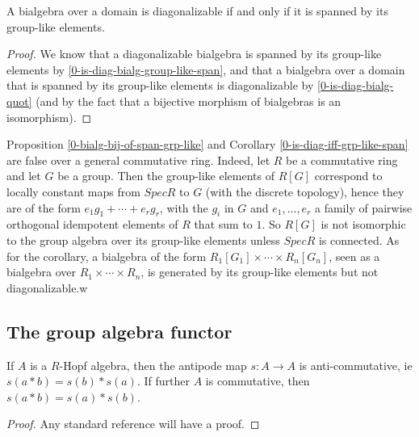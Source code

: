 \begin{corollary}
  \label{0-is-diag-bialg-iff-span-group-like}
  \leanok

  A bialgebra over a domain is diagonalizable if and only if it is spanned by its
  group-like elements.
\end{corollary}
\begin{proof}
  \leanok

  We know that a diagonalizable bialgebra is spanned by its group-like elements
  by \ref{0-is-diag-bialg-group-like-span}, and that a bialgebra over a domain
  that is spanned by its group-like elements is diagonalizable by
  \ref{0-is-diag-bialg-quot} (and by the fact that a bijective morphism
  of bialgebras is an isomorphism).
\end{proof}

Proposition \ref{0-bialg-bij-of-span-grp-like} and Corollary \ref{0-is-diag-iff-grp-like-span} are false over a general commutative ring.
Indeed, let $R$ be a commutative ring and let $G$ be a group.
Then the group-like elements of $R[G]$ correspond to locally constant maps from $Spec R$ to $G$ (with the discrete topology),
hence they are of the form $e_1 g_1+\cdots+e_r g_r$, with the $g_i$ in $G$ and $e_1,\ldots,e_r$ a family of pairwise orthogonal idempotent elements of $R$ that sum to $1$.
So $R[G]$ is not isomorphic to the group algebra over its group-like elements unless $Spec R$ is connected.
As for the corollary, a bialgebra of the form $R_1[G_1]\times\cdots\times R_n[G_n]$,
seen as a bialgebra over $R_1\times\cdots\times R_n$,
is generated by its group-like elements but not diagonalizable.w


\subsection{The group algebra functor}


\begin{proposition}
  \label{0-antipode-mul}
  \uses{}
  \leanok

  If $A$ is a $R$-Hopf algebra, then the antipode map $s : A \to A$ is anti-commutative, ie $s(a * b) = s(b) * s(a)$. If further $A$ is commutative, then $s(a * b) = s(a) * s(b)$.
\end{proposition}
\begin{proof}
  \uses{}
  \leanok

  Any standard reference will have a proof.
\end{proof}


